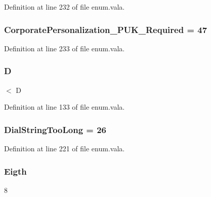Definition at line 232 of file enum.\-vala.

\hypertarget{enum_8vala_a7db526459a05087626906cb30d5dea1f}{
\subsubsection[{Corporate\-Personalization\-\_\-\-P\-U\-K\-\_\-\-Required}]{\setlength{\rightskip}{0pt plus 5cm}Corporate\-Personalization\-\_\-\-P\-U\-K\-\_\-\-Required = 47}}\label{enum_8vala_a7db526459a05087626906cb30d5dea1f}


Definition at line 233 of file enum.\-vala.

\hypertarget{enum_8vala_a350bfcb1e3cfb28ddff48ce525d4f139}{
\subsubsection[{D}]{\setlength{\rightskip}{0pt plus 5cm}D}}\label{enum_8vala_a350bfcb1e3cfb28ddff48ce525d4f139}
$<$ D 

Definition at line 133 of file enum.\-vala.

\hypertarget{enum_8vala_a1d8e3c259a652e59cebc60a29ac496c5}{
\subsubsection[{Dial\-String\-Too\-Long}]{\setlength{\rightskip}{0pt plus 5cm}Dial\-String\-Too\-Long = 26}}\label{enum_8vala_a1d8e3c259a652e59cebc60a29ac496c5}


Definition at line 221 of file enum.\-vala.

\hypertarget{enum_8vala_ac5a31d996f5dd33cf991970e41362b65}{
\subsubsection[{Eigth}]{\setlength{\rightskip}{0pt plus 5cm}Eigth}}\label{enum_8vala_ac5a31d996f5dd33cf991970e41362b65}
8 

